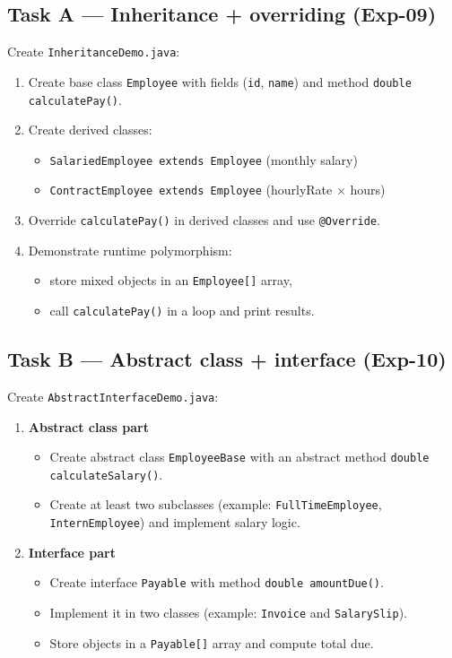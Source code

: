 \documentclass[11pt]{article}
\begin{document}
\subsection{Task A --- Inheritance + overriding (Exp-09)}
Create \texttt{InheritanceDemo.java}:
\begin{enumerate}[leftmargin=*]
  \item Create base class \texttt{Employee} with fields (\texttt{id}, \texttt{name}) and method \texttt{double calculatePay()}.
  \item Create derived classes:
  \begin{itemize}[leftmargin=*]
    \item \texttt{SalariedEmployee extends Employee} (monthly salary)
    \item \texttt{ContractEmployee extends Employee} (hourlyRate $\times$ hours)
  \end{itemize}
  \item Override \texttt{calculatePay()} in derived classes and use \texttt{@Override}.
  \item Demonstrate runtime polymorphism:
  \begin{itemize}[leftmargin=*]
    \item store mixed objects in an \texttt{Employee[]} array,
    \item call \texttt{calculatePay()} in a loop and print results.
  \end{itemize}
\end{enumerate}

\subsection{Task B --- Abstract class + interface (Exp-10)}
Create \texttt{AbstractInterfaceDemo.java}:
\begin{enumerate}[leftmargin=*]
  \item \textbf{Abstract class part}
  \begin{itemize}[leftmargin=*]
    \item Create abstract class \texttt{EmployeeBase} with an abstract method \texttt{double calculateSalary()}.
    \item Create at least two subclasses (example: \texttt{FullTimeEmployee}, \texttt{InternEmployee}) and implement salary logic.
  \end{itemize}

  \item \textbf{Interface part}
  \begin{itemize}[leftmargin=*]
    \item Create interface \texttt{Payable} with method \texttt{double amountDue()}.
    \item Implement it in two classes (example: \texttt{Invoice} and \texttt{SalarySlip}).
    \item Store objects in a \texttt{Payable[]} array and compute total due.
  \end{itemize}
\end{enumerate}
\end{document}
